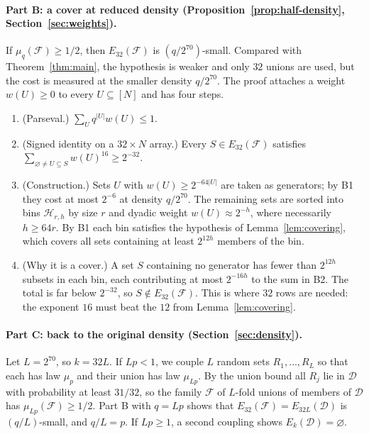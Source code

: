 \documentclass[11pt,letterpaper]{article}
\theoremstyle{definition}
\theoremstyle{remark}
\numberwithin{equation}{section}
\begin{document}
\paragraph{Part B: a cover at reduced density
(Proposition~\ref{prop:half-density}, Section~\ref{sec:weights}).}
If $\mu_q(\mathcal F)\ge1/2$, then $E_{32}(\mathcal F)$ is $(q/2^{70})$-small.
Compared with Theorem~\ref{thm:main}, the hypothesis is weaker and only $32$
unions are used, but the cost is measured at the smaller density $q/2^{70}$.
The proof attaches a weight $w(U)\ge0$ to every $U\subseteq[N]$ and has four
steps.
\begin{enumerate}[label=\textbf{B\arabic*.}]
\item (Parseval.) $\sum_{U}q^{|U|}w(U)\le1$.
\item (Signed identity on a $32\times N$ array.) Every $S\in E_{32}(\mathcal F)$
satisfies $\sum_{\varnothing\ne U\subseteq S}w(U)^{16}\ge2^{-32}$.
\item (Construction.) Sets $U$ with $w(U)\ge2^{-64|U|}$ are taken as generators;
by B1 they cost at most $2^{-6}$ at density $q/2^{70}$. The remaining sets are
sorted into bins $\mathcal H_{r,h}$ by size $r$ and dyadic weight
$w(U)\approx2^{-h}$, where necessarily $h\ge64r$. By B1 each bin satisfies the
hypothesis of Lemma~\ref{lem:covering}, which covers all sets containing at
least $2^{12h}$ members of the bin.
\item (Why it is a cover.) A set $S$ containing no generator has fewer than
$2^{12h}$ subsets in each bin, each contributing at most $2^{-16h}$ to the sum
in B2. The total is far below $2^{-32}$, so $S\notin E_{32}(\mathcal F)$. This
is where $32$ rows are needed: the exponent $16$ must beat the $12$ from
Lemma~\ref{lem:covering}.
\end{enumerate}

\paragraph{Part C: back to the original density
(Section~\ref{sec:density}).}
Let $L=2^{70}$, so $k=32L$. If $Lp<1$, we couple $L$ random sets
$R_1,\ldots,R_L$ so that each has law $\mu_p$ and their union has law
$\mu_{Lp}$. By the union bound all $R_j$ lie in $\mathcal D$ with probability
at least $31/32$, so the family $\mathcal F$ of $L$-fold unions of members of
$\mathcal D$ has $\mu_{Lp}(\mathcal F)\ge1/2$. Part B with $q=Lp$ shows that
$E_{32}(\mathcal F)=E_{32L}(\mathcal D)$ is $(q/L)$-small, and $q/L=p$. If
$Lp\ge1$, a second coupling shows $E_k(\mathcal D)=\varnothing$.
\end{document}
